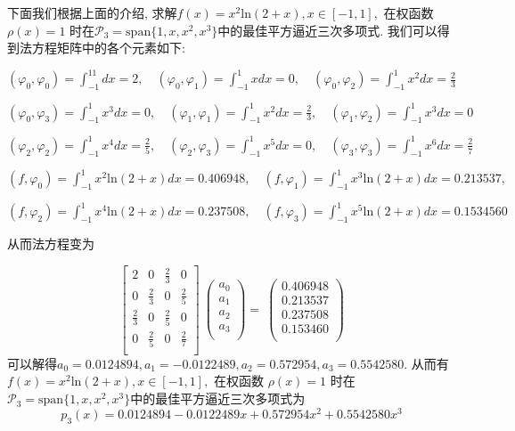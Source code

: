 \documentclass[a4paper]{article}
\begin{document}
\begin{spacing}{1.5}
\begin{CJK*}{GBK}{song}
下面我们根据上面的介绍, 求解$f(x)=x^2\text{ln}(2+x), x\in [-1, 1],$ 在权函数 $\rho(x)=1$ 时在$\mathscr{P}_3=\text{span}\{1,x,x^2,x^3\}$中的最佳平方逼近三次多项式.
我们可以得到法方程矩阵中的各个元素如下:

\centerline{$(\varphi_0,\varphi_0)=\int_{-1}^11dx=2,\quad (\varphi_0,\varphi_1)=\int_{-1}^1xdx=0,\quad (\varphi_0,\varphi_2)=\int_{-1}^1x^2dx=\frac{2}{3}$}

\centerline{$(\varphi_0,\varphi_3)=\int_{-1}^1x^3dx=0,\quad (\varphi_1,\varphi_1)=\int_{-1}^1x^2dx=\frac{2}{3},\quad (\varphi_1,\varphi_2)=\int_{-1}^1x^3dx=0$}

\centerline{$(\varphi_2,\varphi_2)=\int_{-1}^1x^4dx=\frac{2}{5},\quad (\varphi_2,\varphi_3)=\int_{-1}^1x^5dx=0,\quad (\varphi_3,\varphi_3)=\int_{-1}^1x^6dx=\frac{2}{7}$}


\centerline{$(f,\varphi_0)=\int_{-1}^1 x^2\text{ln}(2+x)dx=0.406948,\quad (f,\varphi_1)=\int_{-1}^1 x^3\text{ln}(2+x)dx= 0.213537,$}

\centerline{$(f,\varphi_2)=\int_{-1}^1 x^4\text{ln}(2+x)dx=0.237508,\quad (f,\varphi_3)=\int_{-1}^1 x^5\text{ln}(2+x)dx=0.1534560$}

从而法方程变为

\begin{equation}
\left[                %
            \begin{array}{cccc}   %
            2 & 0 & \frac{2}{3} & 0 \\
            0 & \frac{2}{3} & 0& \frac{2}{5} \\
            \frac{2}{3} & 0 & \frac{2}{5}& 0 \\
            0 &\frac{2}{5} & 0 & \frac{2}{7} \\
            \end{array}
            \right]             %
\
\left(
            \begin{array}{c}
            a_0 \\
            a_1 \\
            a_2 \\
            a_3 \\
            \end{array}
            \right)
=
\
\left(
            \begin{array}{c}
            0.406948 \\
            0.213537 \\
            0.237508 \\
            0.153460 \\
            \end{array}
            \right)
\end{equation}
可以解得$a_0=0.0124894, a_1 = -0.0122489, a_2=0.572954, a_3 = 0.5542580$. 从而有$f(x)=x^2\text{ln}(2+x), x\in [-1, 1],$ 在权函数 $\rho(x)=1$ 时在$\mathscr{P}_3=\text{span}\{1,x,x^2,x^3\}$中的最佳平方逼近三次多项式为
\begin{equation}
p_3(x) = 0.0124894-0.0122489x+0.572954x^2+0.5542580x^3
\end{equation}


\end{CJK*}
\end{spacing}
\end{document}
